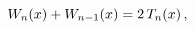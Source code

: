 \[\mathop{W_{n}\/}\nolimits\!\left(x\right)+\mathop{W_{n-1}\/}\nolimits\!\left(x%
\right)=2\mathop{T_{n}\/}\nolimits\!\left(x\right),\]